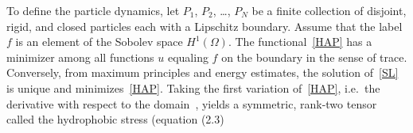 %
%
%
To define the particle dynamics, let $P_1$, $P_2$, \ldots, $P_N$ be a
finite collection of disjoint, rigid, and closed particles each with
a Lipschitz boundary. Assume that the label $f$ is an element of the
Sobolev space $H^1(\Omega)$. The functional~\eqref{HAP} has a minimizer
among all functions $u$ equaling $f$ on the boundary in the sense of
trace. Conversely, from maximum principles and energy estimates, the
solution of~\eqref{SL} is unique and minimizes~\eqref{HAP}. Taking the
first variation of~\eqref{HAP}, i.e.~the derivative with respect to the
domain~\cite{Bandle2015, Schiffer1954, Grinfeld2010}, yields a
symmetric, rank-two tensor called the hydrophobic stress (equation (2.3)
